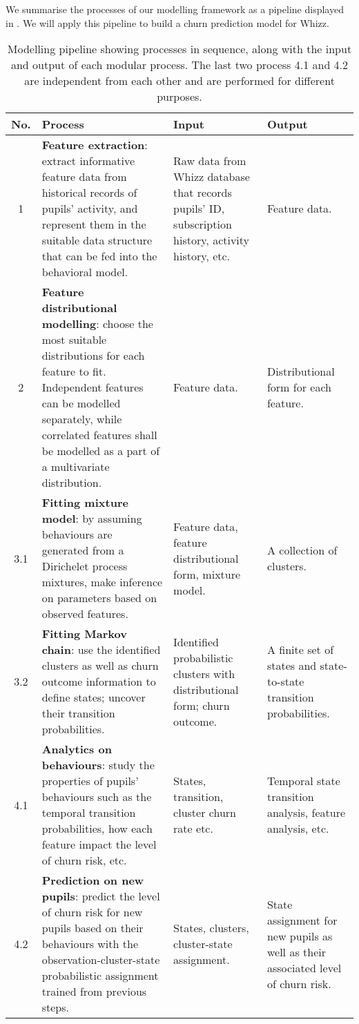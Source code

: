 \documentclass[english,a4,oneside,9pt]{extarticle}
\begin{document}
We summarise the processes of our modelling framework as a pipeline displayed in . We will apply this pipeline to build a churn prediction model for Whizz.

\begin{figure}[htb]
\centering
\end{figure}

\begin{table}[htb]
\vspace*{-5mm}
\centering
\footnotesize
\begin{tabular}{c|p{5.5cm}|p{3cm}|p{2.5cm}}
\hline
\textbf{No.} & \textbf{Process} & \textbf{Input} & \textbf{Output} \\
\hline
1 &
\textbf{Feature extraction}: extract informative feature data from historical records of pupils' activity, and represent them in the suitable data structure that can be fed into the behavioral model.&
Raw data from Whizz database that records pupils' ID, subscription history, activity history, etc. & 
Feature data. \\
\hline
2 &
\textbf{Feature distributional modelling}: choose the most suitable distributions for each feature to fit. Independent features can be modelled separately, while correlated features shall be modelled as a part of a multivariate distribution. &
Feature data. & 
Distributional form for each feature. \\
\hline
3.1 &
\textbf{Fitting mixture model}: by assuming behaviours are generated from a Dirichelet process mixtures, make inference on parameters based on observed features.&
Feature data, feature distributional form, mixture model.& 
A collection of clusters. \\
\hline
3.2 &
\textbf{Fitting Markov chain}: use the identified clusters as well as churn outcome information to define states; uncover their transition probabilities. &
Identified probabilistic clusters with distributional form; churn outcome. & 
A finite set of states and state-to-state transition probabilities. \\
\hline
4.1 &
\textbf{Analytics on behaviours}: study the properties of pupils' behaviours such as the temporal transition probabilities, how each feature impact the level of churn risk, etc. &
States, transition, cluster churn rate etc. & 
Temporal state transition analysis, feature analysis, etc. \\
\hline
4.2 &
\textbf{Prediction on new pupils}: predict the level of churn risk for new pupils based on their behaviours with the observation-cluster-state probabilistic assignment trained from previous steps. &
States, clusters, cluster-state assignment. & 
State assignment for new pupils as well as their associated level of churn risk. \\
\hline
\end{tabular}
\caption{Modelling pipeline showing processes in sequence, along with the input and output of each modular process. The last two process 4.1 and 4.2 are independent from each other and are performed for different purposes.}
\label{tab:pipeline}
\end{table}
\end{document}
